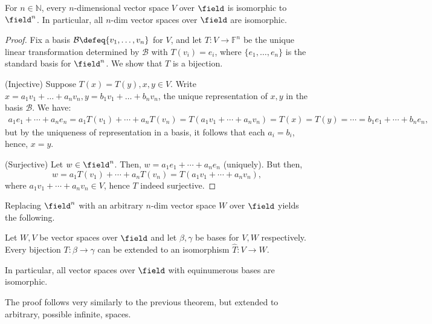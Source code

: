 \begin{theorem}
    For $n \in \mathbb{N}$, every $n$-dimensional vector space $V$ over $\field$ is isomorphic to $\field^n$. In particular, all $n$-dim vector spaces over $\field$ are isomorphic.
\end{theorem}
\begin{proof}
    Fix a basis $\mathcal{B} \defeq \{v_1, \dots, v_n\}$ for $V$, and let $T: V \to \mathbb{F}^n$ be the unique linear transformation determined by $\mathcal{B}$ with $T(v_i) = e_i$, where $\{e_1, \dots, e_n\}$ is the standard basis for $\field^n$. We show that $T$ is a bijection.

    \noindent(Injective) Suppose $T(x) = T(y), x, y \in V$. Write $x = a_1 v_1 +\dots + a_n v_n, y = b_1 v_1 + \dots + b_n v_n$, the unique representation of $x, y$ in the basis $\mathcal{B}$. We have: \begin{align*}
        a_1 e_1 + \cdots + a_n e_n = a_1T(v_1) + \cdots + a_n T(v_n) = T(a_1v_1 + \cdots + a_n v_n) = T(x) = T(y) = \cdots = b_1 e_1 + \cdots + b_n e_n,
    \end{align*}
    but by the uniqueness of representation in a basis, it follows that each $a_i = b_i$, hence, $x = y$.

    \noindent(Surjective) Let $w \in \field^n$. Then, $w = a_1 e_1 + \cdots + a_n e_n$ (uniquely). But then, \[
    w = a_1T(v_1) + \cdots + a_nT(v_n) = T(a_1 v_1 + \cdots + a_n v_n),    
    \]
    where $a_1 v_1 + \cdots + a_n v_n \in V$, hence $T$ indeed surjective.
\end{proof}
\begin{remark}
    Replacing $\field^n$ with an arbitrary $n$-dim vector space $W$ over $\field$ yields the following.
\end{remark}

\begin{theorem}
    Let $W, V$ be vector spaces over $\field$ and let $\beta, \gamma$ be bases for $V, W$ respectively. Every bijection $T : \beta \to \gamma$ can be extended to an isomorphism $\hat{T} : V \to W$.

    In particular, all vector spaces over $\field$ with equinumerous bases are isomorphic.
\end{theorem}

\begin{remark}
    The proof follows very similarly to the previous theorem, but extended to arbitrary, possible infinite, spaces.
\end{remark}

